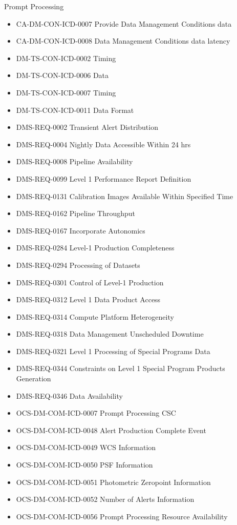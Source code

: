 Prompt Processing \begin{itemize}
\item CA-DM-CON-ICD-0007 Provide Data Management Conditions data
\item CA-DM-CON-ICD-0008 Data Management Conditions data latency
\item DM-TS-CON-ICD-0002 Timing
\item DM-TS-CON-ICD-0006 Data
\item DM-TS-CON-ICD-0007 Timing
\item DM-TS-CON-ICD-0011 Data Format
\item DMS-REQ-0002 Transient Alert Distribution
\item DMS-REQ-0004 Nightly Data Accessible Within 24 hrs
\item DMS-REQ-0008 Pipeline Availability
\item DMS-REQ-0099 Level 1 Performance Report Definition
\item DMS-REQ-0131 Calibration Images Available Within Specified Time
\item DMS-REQ-0162 Pipeline Throughput
\item DMS-REQ-0167 Incorporate Autonomics
\item DMS-REQ-0284 Level-1 Production Completeness
\item DMS-REQ-0294 Processing of Datasets
\item DMS-REQ-0301 Control of Level-1 Production
\item DMS-REQ-0312 Level 1 Data Product Access
\item DMS-REQ-0314 Compute Platform Heterogeneity
\item DMS-REQ-0318 Data Management Unscheduled Downtime
\item DMS-REQ-0321 Level 1 Processing of Special Programs Data
\item DMS-REQ-0344 Constraints on Level 1 Special Program Products Generation
\item DMS-REQ-0346 Data Availability
\item OCS-DM-COM-ICD-0007 Prompt Processing CSC
\item OCS-DM-COM-ICD-0048 Alert Production Complete Event
\item OCS-DM-COM-ICD-0049 WCS Information
\item OCS-DM-COM-ICD-0050 PSF Information
\item OCS-DM-COM-ICD-0051 Photometric Zeropoint Information
\item OCS-DM-COM-ICD-0052 Number of Alerts Information
\item OCS-DM-COM-ICD-0056 Prompt Processing Resource Availability
\end{itemize}
